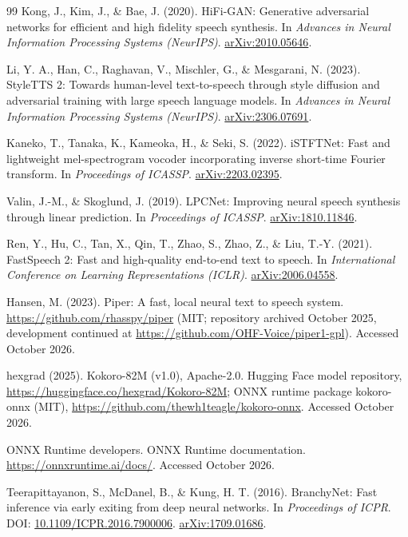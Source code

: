 \documentclass[11pt,a4paper]{article}
\begin{document}
\begin{thebibliography}{99}
Kong, J., Kim, J., \& Bae, J. (2020).
HiFi-GAN: Generative adversarial networks for efficient and high fidelity speech synthesis.
In \textit{Advances in Neural Information Processing Systems (NeurIPS)}.
\href{https://arxiv.org/abs/2010.05646}{arXiv:2010.05646}.

Li, Y. A., Han, C., Raghavan, V., Mischler, G., \& Mesgarani, N. (2023).
StyleTTS 2: Towards human-level text-to-speech through style diffusion and adversarial training with large speech language models.
In \textit{Advances in Neural Information Processing Systems (NeurIPS)}.
\href{https://arxiv.org/abs/2306.07691}{arXiv:2306.07691}.

Kaneko, T., Tanaka, K., Kameoka, H., \& Seki, S. (2022).
iSTFTNet: Fast and lightweight mel-spectrogram vocoder incorporating inverse short-time Fourier transform.
In \textit{Proceedings of ICASSP}.
\href{https://arxiv.org/abs/2203.02395}{arXiv:2203.02395}.

Valin, J.-M., \& Skoglund, J. (2019).
LPCNet: Improving neural speech synthesis through linear prediction.
In \textit{Proceedings of ICASSP}.
\href{https://arxiv.org/abs/1810.11846}{arXiv:1810.11846}.

Ren, Y., Hu, C., Tan, X., Qin, T., Zhao, S., Zhao, Z., \& Liu, T.-Y. (2021).
FastSpeech 2: Fast and high-quality end-to-end text to speech.
In \textit{International Conference on Learning Representations (ICLR)}.
\href{https://arxiv.org/abs/2006.04558}{arXiv:2006.04558}.

Hansen, M. (2023).
Piper: A fast, local neural text to speech system.
\url{https://github.com/rhasspy/piper} (MIT; repository archived October 2025, development continued at \url{https://github.com/OHF-Voice/piper1-gpl}). Accessed October 2026.

hexgrad (2025).
Kokoro-82M (v1.0), Apache-2.0.
Hugging Face model repository, \url{https://huggingface.co/hexgrad/Kokoro-82M}; ONNX runtime package kokoro-onnx (MIT), \url{https://github.com/thewh1teagle/kokoro-onnx}. Accessed October 2026.

ONNX Runtime developers.
ONNX Runtime documentation.
\url{https://onnxruntime.ai/docs/}. Accessed October 2026.

Teerapittayanon, S., McDanel, B., \& Kung, H. T. (2016).
BranchyNet: Fast inference via early exiting from deep neural networks.
In \textit{Proceedings of ICPR}. DOI: \href{https://doi.org/10.1109/ICPR.2016.7900006}{10.1109/ICPR.2016.7900006}.
\href{https://arxiv.org/abs/1709.01686}{arXiv:1709.01686}.


\end{thebibliography}
\end{document}
